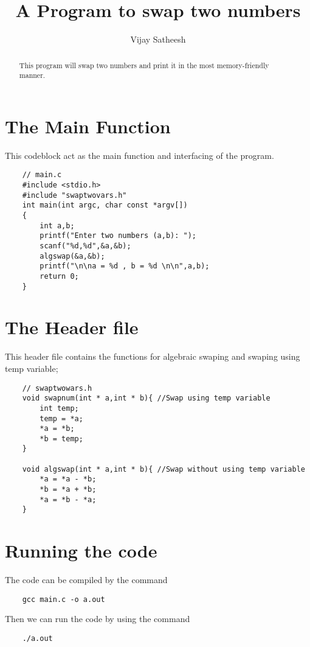 \documentclass[10pt,letterpaper]{article}
\begin{document}
\title{A Program to swap two numbers}
\author{Vijay Satheesh}

\maketitle

\begin{abstract}
    This program will swap two numbers and print it in the most memory-friendly manner.
\end{abstract}



\lstset{language=C}
\section{The Main Function}
    This codeblock act as the main function and interfacing of the program.
    \begin{lstlisting}
    // main.c
    #include <stdio.h>
    #include "swaptwovars.h"
    int main(int argc, char const *argv[])
    {
        int a,b;
        printf("Enter two numbers (a,b): ");
        scanf("%d,%d",&a,&b);
        algswap(&a,&b);
        printf("\n\na = %d , b = %d \n\n",a,b);
        return 0;
    }

        \end{lstlisting}
\section{The Header file}
This header file contains the functions for algebraic swaping and swaping using temp variable;
\begin{lstlisting}
    // swaptwowars.h
    void swapnum(int * a,int * b){ //Swap using temp variable
        int temp;
        temp = *a;
        *a = *b;
        *b = temp;
    }

    void algswap(int * a,int * b){ //Swap without using temp variable
        *a = *a - *b;
        *b = *a + *b;
        *a = *b - *a;
    }

\end{lstlisting}

\section{Running the code}
The code can be compiled by the command
\begin{lstlisting}
    gcc main.c -o a.out
\end{lstlisting}


Then we can run the code by using the command 
\begin{lstlisting}
    ./a.out
\end{lstlisting}
\end{document}
